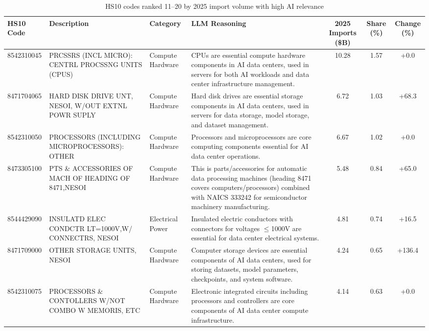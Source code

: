 \begin{landscape}
\begin{table}[htbp]
\centering
\footnotesize
\caption{HS10 codes ranked 11--20 by 2025 import volume with high AI relevance}
\label{tab:top11to20_high_relevance_landscape}
\setlength{\tabcolsep}{2mm}
\renewcommand{\arraystretch}{1.0}
\begin{tabular}{lp{4cm}lp{6cm}ccc}
\toprule
HS10 Code & Description & Category & LLM Reasoning & 2025 Imports (\$B) & Share (\%) & Change (\%) \\
\midrule
8542310045 & {\scriptsize PRCSSRS (INCL MICRO): CENTRL PROCSSNG UNITS (CPUS)} & Compute Hardware & {\scriptsize CPUs are essential compute hardware components in AI data centers, used in servers for both AI workloads and data center infrastructure management.} & 10.28 & 1.57 & +0.0 \\
8471704065 & {\scriptsize HARD DISK DRIVE UNT, NESOI, W/OUT EXTNL POWR SUPLY} & Compute Hardware & {\scriptsize Hard disk drives are essential storage components in AI data centers, used in servers for data storage, model storage, and dataset management.} & 6.72 & 1.03 & +68.3 \\
8542310050 & {\scriptsize PROCESSORS (INCLUDING MICROPROCESSORS): OTHER} & Compute Hardware & {\scriptsize Processors and microprocessors are core computing components essential for AI data center operations.} & 6.67 & 1.02 & +0.0 \\
8473305100 & {\scriptsize PTS \& ACCESSORIES OF MACH OF HEADING OF 8471,NESOI} & Compute Hardware & {\scriptsize This is parts/accessories for automatic data processing machines (heading 8471 covers computers/processors) combined with NAICS 333242 for semiconductor machinery manufacturing.} & 5.48 & 0.84 & +65.0 \\
8544429090 & {\scriptsize INSULATD ELEC CONDCTR LT=1000V,W/ CONNECTRS, NESOI} & Electrical Power & {\scriptsize Insulated electric conductors with connectors for voltages $\leq$1000V are essential for data center electrical systems.} & 4.81 & 0.74 & +16.5 \\
8471709000 & {\scriptsize OTHER STORAGE UNITS, NESOI} & Compute Hardware & {\scriptsize Computer storage devices are essential components of AI data centers, used for storing datasets, model parameters, checkpoints, and system software.} & 4.24 & 0.65 & +136.4 \\
8542310075 & {\scriptsize PROCESSORS \& CONTOLLERS W/NOT COMBO W MEMORIS, ETC} & Compute Hardware & {\scriptsize Electronic integrated circuits including processors and controllers are core components of AI data center compute infrastructure.} & 4.14 & 0.63 & +0.0 \\

\end{tabular}
\end{table}
\end{landscape}
